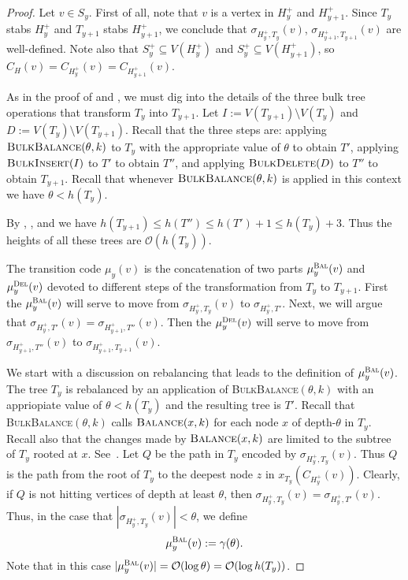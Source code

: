 \documentclass[kpfonts]{patmorin}
\newcommand{\Oh}{\mathcal{O}}
\let\leq\leqslant
\begin{document}
\begin{proof}
  Let $v \in S_y$. 
  First of all, note that $v$ is a vertex in $H^+_y$ and $H^+_{y+1}$.
  Since $T_y$ stabs $H^+_y$ and $T_{y+1}$ stabs $H^+_{y+1}$,
  we conclude that $\sigma_{H^+_{y},T_y}(v)$, $\sigma_{H^+_{y+1},T_{y+1}}(v)$ are well-defined. 
  Note also that $S_y^+ \subseteq V(H_y^+)$ and $S_y^+ \subseteq V(H_{y+1}^+)$, 
  so $C_H(v) = C_{H_y^+}(v) = C_{H_{y+1}^+}(v)$.

  As in the proof of  and , we must dig into the details of the three bulk tree operations that transform $T_y$ into $T_{y+1}$. 
  Let $I:=V(T_{y+1})\setminus V(T_{y})$ and $D:=V(T_y)\setminus V(T_{y+1})$.
  Recall that the three steps are: 
  applying $\textsc{BulkBalance}(\theta,k)$ to $T_y$ with the appropriate value of $\theta$ to obtain $T'$,
  applying $\textsc{BulkInsert}(I)$ to $T'$ to obtain $T''$, and
  applying $\textsc{BulkDelete}(D)$ to $T''$ to obtain $T_{y+1}$.
  Recall that whenever $\textsc{BulkBalance}(\theta,k)$ is applied in this context we have $\theta < h(T_y)$.


  By , , and  we have  $h(T_{y+1}) \leq h(T'') \leq h(T')+1 \leq h(T_y)+3$.
  Thus the heights of all these trees are $\Oh(h(T_y))$.

  The transition code $\mu_y(v)$ is the concatenation of two parts $\mu_y^{\textsc{Bal}}(v)$ and $\mu_y^{\textsc{Del}}(v)$ devoted to different steps of the transformation from $T_y$ to $T_{y+1}$. 
  First the $\mu_y^{\textsc{Bal}}(v)$ will serve to move from $\sigma_{H^+_y,T_y}(v)$ to $\sigma_{H^+_y,T'}$. 
  Next, we will argue that $\sigma_{H^+_y,T'}(v) = \sigma_{H^+_{y+1},T''}(v)$.
  Then the $\mu_y^{\textsc{Del}}(v)$ will serve to move from $\sigma_{H^+_{y+1},T''}(v)$ to $\sigma_{H^+_{y+1},T_{y+1}}(v)$.

  We start with a discussion on rebalancing that leads to the definition of $\mu_y^{\textsc{Bal}}(v)$. 
  The tree $T_y$ is rebalanced by an application of \textsc{BulkBalance}$(\theta,k)$ with an appriopiate value of $\theta < h(T_y)$ and the resulting tree is $T'$.
  Recall that \textsc{BulkBalance}$(\theta,k)$ calls $\textsc{Balance}(x,k)$ for each node $x$ of depth-$\theta$ in $T_y$.
  Recall also that the changes made by $\textsc{Balance}(x,k)$ are limited to the subtree of $T_y$ rooted at $x$.
  See~. 
  Let $Q$ be the path in $T_y$ encoded by $\sigma_{H^+_{y},T_{y}}(v)$. 
  Thus $Q$ is the path from the root of $T_y$ to the deepest node $z$ in $x_{T_y}(C_{H^+_{y}}(v))$.
  Clearly, if $Q$ is not hitting vertices of depth at least $\theta$, then $\sigma_{H^+_{y},T_{y}}(v)=\sigma_{H^+_{y},T'}(v)$.
  Thus, in the case that $|\sigma_{H^+_{y},T_{y}}(v)| < \theta$, we define
  \[
  \mu_y^{\textsc{Bal}}(v) := \gamma(\theta).
  \]
  Note that in this case $|\mu_y^{\textsc{Bal}}(v)| = \Oh(\log \theta) = \Oh(\log h(T_y))$.


\end{proof}
\end{document}
